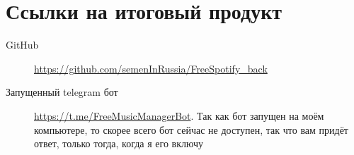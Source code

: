 \chapter{Ссылки на итоговый продукт}

\begin{description}
\item[GitHub] \url{https://github.com/semenInRussia/FreeSpotify_back}
\item[Запущенный telegram бот]
  \url{https://t.me/FreeMusicManagerBot}.  Так как бот запущен на моём компьютере, то скорее всего бот сейчас не доступен, так что вам придёт ответ, только тогда, когда я его включу
\end{description}

